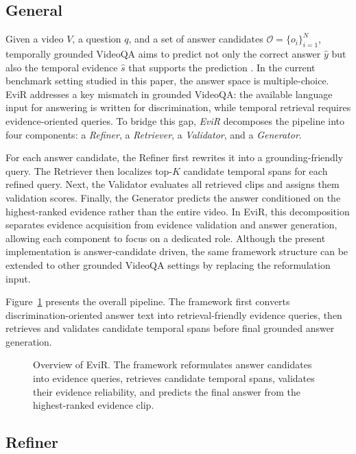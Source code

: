 \subsection{General}
\label{sec:method_overview}

Given a video $V$, a question $q$, and a set of answer candidates $\mathcal{O}=\{o_i\}_{i=1}^{N}$, temporally grounded VideoQA aims to predict not only the correct answer $\hat{y}$ but also the temporal evidence $\hat{s}$ that supports the prediction \cite{xiao2024can,chen2024rextime}. In the current benchmark setting studied in this paper, the answer space is multiple-choice. EviR addresses a key mismatch in grounded VideoQA: the available language input for answering is written for discrimination, while temporal retrieval requires evidence-oriented queries. To bridge this gap, \emph{EviR} decomposes the pipeline into four components: a \emph{Refiner}, a \emph{Retriever}, a \emph{Validator}, and a \emph{Generator}.

For each answer candidate, the Refiner first rewrites it into a grounding-friendly query. The Retriever then localizes top-$K$ candidate temporal spans for each refined query. Next, the Validator evaluates all retrieved clips and assigns them validation scores. Finally, the Generator predicts the answer conditioned on the highest-ranked evidence rather than the entire video. In EviR, this decomposition separates evidence acquisition from evidence validation and answer generation, allowing each component to focus on a dedicated role. Although the present implementation is answer-candidate driven, the same framework structure can be extended to other grounded VideoQA settings by replacing the reformulation input.

Figure~\ref{fig:evir_overview} presents the overall pipeline. The framework first converts discrimination-oriented answer text into retrieval-friendly evidence queries, then retrieves and validates candidate temporal spans before final grounded answer generation.

\begin{figure}[t]
    \centering
    
    \caption{Overview of EviR. The framework reformulates answer candidates into evidence queries, retrieves candidate temporal spans, validates their evidence reliability, and predicts the final answer from the highest-ranked evidence clip.}
    \label{fig:evir_overview}
\end{figure}

\subsection{Refiner}
\label{sec:refiner}

